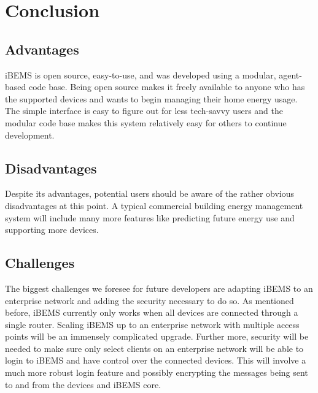 \chapter{Conclusion}
\label{ch: Chapter5}


\section{Advantages}
iBEMS is open source, easy-to-use, and was developed using a modular, agent-based code base. Being open source makes it freely available to anyone who has the supported devices and wants to begin managing their home energy usage. The simple interface is easy to figure out for less tech-savvy users and the modular code base makes this system relatively easy for others to continue development. 

\section{Disadvantages}
Despite its advantages, potential users should be aware of the rather obvious disadvantages at this point. A typical commercial building energy management system will include many more features like predicting future energy use and supporting more devices.

\section{Challenges}
The biggest challenges we foresee for future developers are adapting iBEMS to an enterprise network and adding the security necessary to do so. As mentioned before, iBEMS currently only works when all devices are connected through a single router. Scaling iBEMS up to an enterprise network with multiple access points will be an immensely complicated upgrade. Further more, security will be needed to make sure only select clients on an enterprise network will be able to login to iBEMS and have control over the connected devices. This will involve a much more robust login feature and possibly encrypting the messages being sent to and from the devices and iBEMS core.

